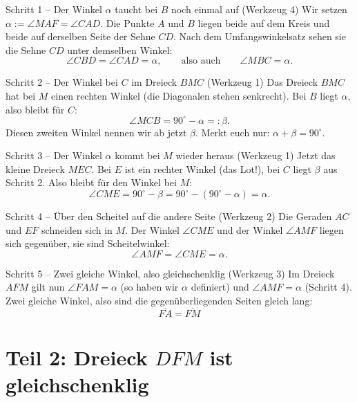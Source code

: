 \documentclass[11pt,a4paper]{article}
\newcommand{\ang}[1]{\angle #1}
\newcommand{\seg}[1]{\overline{#1}}
\begin{document}
\begin{schritt}{Schritt 1 -- Der Winkel $\alpha$ taucht bei $B$ noch einmal auf (Werkzeug 4)}
Wir setzen $\alpha := \ang{MAF} = \ang{CAD}$. Die Punkte $A$ und $B$ liegen beide auf dem Kreis
und beide auf derselben Seite der Sehne $CD$. Nach dem Umfangswinkelsatz sehen sie die Sehne $CD$
unter demselben Winkel:
\[
  \ang{CBD} = \ang{CAD} = \alpha, \qquad\text{also auch}\qquad \ang{MBC} = \alpha .
\]
\end{schritt}

\begin{schritt}{Schritt 2 -- Der Winkel bei $C$ im Dreieck $BMC$ (Werkzeug 1)}
Das Dreieck $BMC$ hat bei $M$ einen rechten Winkel (die Diagonalen stehen senkrecht).
Bei $B$ liegt $\alpha$, also bleibt f\"ur $C$:
\[
  \ang{MCB} = 90^\circ - \alpha =: \beta .
\]
Diesen zweiten Winkel nennen wir ab jetzt $\beta$. Merkt euch nur: $\alpha + \beta = 90^\circ$.
\end{schritt}

\begin{schritt}{Schritt 3 -- Der Winkel $\alpha$ kommt bei $M$ wieder heraus (Werkzeug 1)}
Jetzt das kleine Dreieck $MEC$. Bei $E$ ist ein rechter Winkel (das Lot!), bei $C$ liegt
$\beta$ aus Schritt 2. Also bleibt f\"ur den Winkel bei $M$:
\[
  \ang{CME} = 90^\circ - \beta = 90^\circ - (90^\circ - \alpha) = \alpha .
\]
\end{schritt}

\begin{schritt}{Schritt 4 -- \"Uber den Scheitel auf die andere Seite (Werkzeug 2)}
Die Geraden $AC$ und $EF$ schneiden sich in $M$. Der Winkel $\ang{CME}$ und der Winkel
$\ang{AMF}$ liegen sich gegen\"uber, sie sind Scheitelwinkel:
\[
  \ang{AMF} = \ang{CME} = \alpha .
\]
\end{schritt}

\begin{schritt}{Schritt 5 -- Zwei gleiche Winkel, also gleichschenklig (Werkzeug 3)}
Im Dreieck $AFM$ gilt nun $\ang{FAM} = \alpha$ (so haben wir $\alpha$ definiert) und
$\ang{AMF} = \alpha$ (Schritt 4). Zwei gleiche Winkel, also sind die gegen\"uberliegenden Seiten gleich lang:
\[
  \boxed{\;\seg{FA} = \seg{FM}\;}
\]
\end{schritt}


\section{Teil 2: Dreieck $DFM$ ist gleichschenklig}
\end{document}
